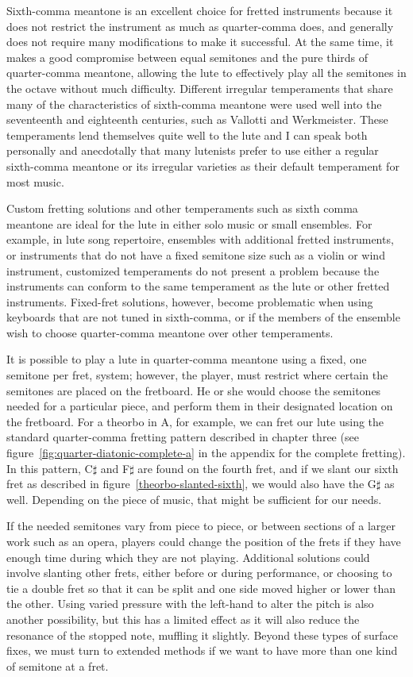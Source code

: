 Sixth-comma meantone is an excellent choice for fretted instruments because it does not
restrict the instrument as much as quarter-comma does, and generally does not require
many modifications to make it successful. At the same time, it makes a good compromise
between equal semitones and the pure thirds of quarter-comma meantone, allowing the
lute to effectively play all the semitones in the octave without much difficulty.
Different irregular temperaments that share many of the characteristics of sixth-comma
meantone were used well into the seventeenth and eighteenth centuries, such as Vallotti
and Werkmeister. These temperaments lend themselves quite well to the lute and I can
speak both personally and anecdotally that many lutenists prefer to use either a
regular sixth-comma meantone or its irregular varieties as their default temperament
for most music.

Custom fretting solutions and other temperaments such as sixth comma meantone are ideal
for the lute in either solo music or small ensembles.  For example, in lute song
repertoire, ensembles with additional fretted instruments, or instruments that do not
have a fixed semitone size such as a violin or wind instrument, customized temperaments
do not present a problem because the instruments can conform to the same temperament as
the lute or other fretted instruments. Fixed-fret solutions, however, become
problematic when using keyboards that are not tuned in sixth-comma, or if the members
of the ensemble wish to choose quarter-comma meantone over other temperaments.

It is possible to play a lute in quarter-comma meantone using a fixed, one semitone per
fret, system; however, the player, must restrict where certain the semitones are
placed on the fretboard.  He or she would choose the semitones needed for a particular
piece, and perform them in their designated location on the fretboard.  For a theorbo
in A, for example, we can fret our lute using the standard quarter-comma fretting
pattern described in chapter three (see figure~\ref{fig:quarter-diatonic-complete-a}
in the appendix for the complete fretting).  In this pattern, C$\sharp$ and F$\sharp$
are found on the fourth fret, and if we slant our sixth fret as described in
figure~\ref{theorbo-slanted-sixth}, we would also have the G$\sharp$ as well. Depending
on the piece of music, that might be sufficient for our needs.

If the needed semitones vary from piece to piece, or between sections of a larger work
such as an opera, players could change the position of the frets if they have enough
time during which they are not playing. Additional solutions could involve slanting
other frets, either before or during performance, or choosing to tie a double fret so
that it can be split and one side moved higher or lower than the other. Using varied
pressure with the left-hand to alter the pitch is also another possibility, but this
has a limited effect as it will also reduce the resonance of the stopped note, muffling
it slightly. Beyond these types of surface fixes, we must turn to extended methods if
we want to have more than one kind of semitone at a fret.

